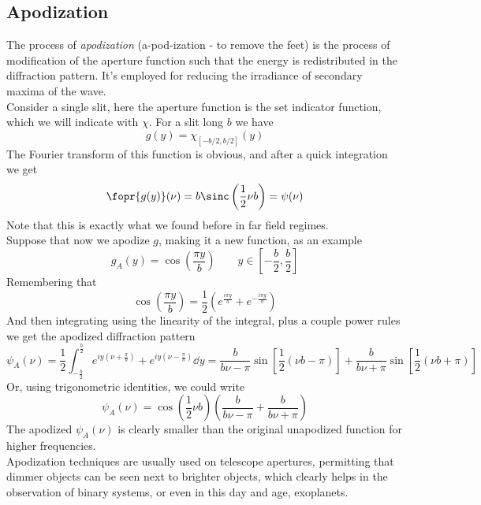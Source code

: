 \documentclass[../electromagnetism.tex]{subfiles}
\begin{document}
\subsection{Apodization}
The process of \textit{apodization} (a-pod-ization - to remove the feet) is the process of modification of the aperture function such that the energy is redistributed in the diffraction pattern. It's employed for reducing the irradiance of secondary maxima of the wave.\\
Consider a single slit, here the aperture function is the set indicator function, which we will indicate with $\chi$. For a slit long $b$ we have
\begin{equation}
	g(y)=\chi_{\left[ -b/2, b/2 \right]}(y)
	\label{eq:slitfn.fdiff}
\end{equation}
The Fourier transform of this function is obvious, and after a quick integration we get
\begin{equation}
	\fopr{g(y)}(\nu)=b\sinc\left( \frac{1}{2}\nu b \right)=\psi(\nu)
	\label{eq:slitpatt.fdiff}
\end{equation}
Note that this is exactly what we found before in far field regimes.\\
Suppose that now we apodize $g$, making it a new function, as an example
\begin{equation*}
	g_A(y)=\cos\left( \frac{\pi y}{b} \right)\qquad y\in\left[ -\frac{b}{2}, \frac{b}{2} \right]
\end{equation*}
Remembering that
\begin{equation*}
	\cos\left( \frac{\pi y}{b} \right)=\frac{1}{2}\left( e^{\frac{i\pi y}{b}}+e^{-\frac{i\pi y}{b}} \right)
\end{equation*}
And then integrating using the linearity of the integral, plus a couple power rules we get the apodized diffraction pattern
\begin{equation*}
	\psi_A(\nu)=\frac{1}{2}\int_{-\frac{b}{2}}^{\frac{b}{2}}e^{iy\left( \nu+\frac{\pi}{b} \right)}+e^{iy\left( \nu-\frac{\pi}{b} \right)}\dd^{}{y}=\frac{b}{b\nu-\pi}\sin\left[ \frac{1}{2}\left( \nu b-\pi \right) \right]+\frac{b}{b\nu+\pi}\sin\left[ \frac{1}{2}\left( \nu b+\pi \right) \right]
\end{equation*}
Or, using trigonometric identities, we could write
\begin{equation}
	\psi_A(\nu)=\cos\left( \frac{1}{2}\nu b \right)\left( \frac{b}{b\nu-\pi}+\frac{b}{b\nu+\pi} \right)
	\label{eq:apodizedslit.fdiff}
\end{equation}
The apodized $\psi_A(\nu)$ is clearly smaller than the original unapodized function for higher frequencies.\\
Apodization techniques are usually used on telescope apertures, permitting that dimmer objects can be seen next to brighter objects, which clearly helps in the observation of binary systems, or even in this day and age, exoplanets.
\end{document}
